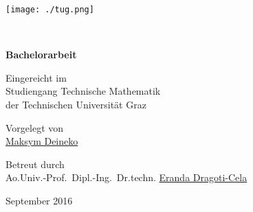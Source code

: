 \documentclass[titlepage]{scrartcl}
\begin{document}
\thispagestyle{empty}


\hfill\texttt{[image: ./tug.png]}

\begin{center}
\vspace{2.4cm}

{}
\\
\vspace{0.52cm}
{}

\vspace{1.65cm}
\vspace{1.6cm}

{\bfseries Bachelorarbeit}

\vspace{1.6cm}
Eingereicht im
\\
Studiengang Technische Mathematik
\\
der Technischen Universität Graz

\vspace{0.8cm}
Vorgelegt von
\\
\href{mailto:deineko@student.tugraz.at}{Maksym Deineko}

\vspace{0.8cm}
Betreut durch
\\
Ao.Univ.-Prof.\ Dipl.-Ing.\ Dr.techn.
\href{mailto:cela@math.tugraz.at}{Eranda Dragoti-Cela}

\vspace{1.7cm}
September 2016

\end{center}
\end{document}
